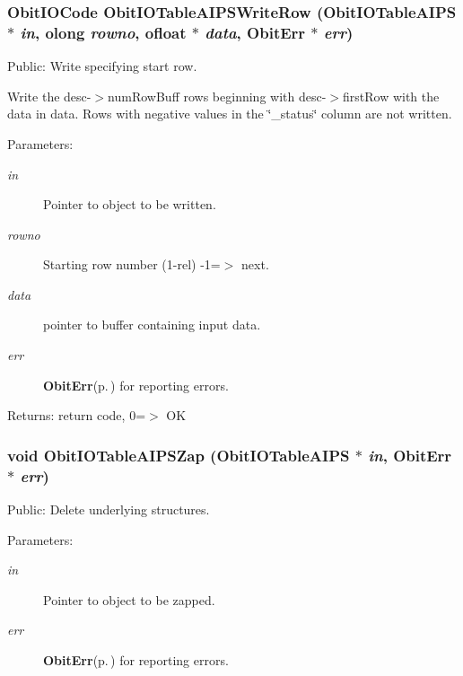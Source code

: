 \subsubsection{\setlength{\rightskip}{0pt plus 5cm}Obit\-IOCode Obit\-IOTable\-AIPSWrite\-Row ({\bf Obit\-IOTable\-AIPS} $\ast$ {\em in}, {\bf olong} {\em rowno}, {\bf ofloat} $\ast$ {\em data}, {\bf Obit\-Err} $\ast$ {\em err})}\label{ObitIOTableAIPS_8h_a15}


Public: Write specifying start row. 

Write the desc-$>$num\-Row\-Buff rows beginning with desc-$>$first\-Row with the data in data. Rows with negative values in the \char`\"{}\_\-status\char`\"{} column are not written. \begin{Desc}
\item[Parameters:]
\begin{description}
\item[{\em in}]Pointer to object to be written. \item[{\em rowno}]Starting row number (1-rel) -1=$>$ next. \item[{\em data}]pointer to buffer containing input data. \item[{\em err}]{\bf Obit\-Err}{\rm (p.\,\pageref{structObitErr})} for reporting errors. \end{description}
\end{Desc}
\begin{Desc}
\item[Returns:]return code, 0=$>$ OK \end{Desc}
\subsubsection{\setlength{\rightskip}{0pt plus 5cm}void Obit\-IOTable\-AIPSZap ({\bf Obit\-IOTable\-AIPS} $\ast$ {\em in}, {\bf Obit\-Err} $\ast$ {\em err})}\label{ObitIOTableAIPS_8h_a7}


Public: Delete underlying structures. 

\begin{Desc}
\item[Parameters:]
\begin{description}
\item[{\em in}]Pointer to object to be zapped. \item[{\em err}]{\bf Obit\-Err}{\rm (p.\,\pageref{structObitErr})} for reporting errors. \end{description}
\end{Desc}
